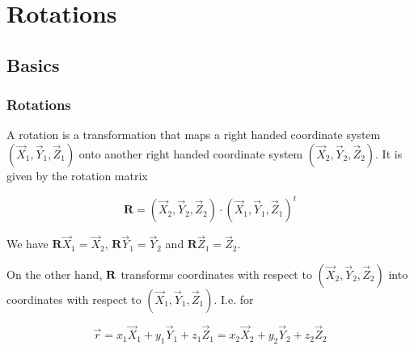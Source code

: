 \documentclass[compress]{beamer}
\begin{document}
\begin{frame}[fragile]
\begin{columns}
\begin{column}{3.5cm}
  \end{column}
\end{columns}


\end{frame}

\section{Rotations}

\subsection*{Basics}

\begin{frame}[fragile]
  \frametitle{Rotations}

  A rotation is a transformation that maps a right handed coordinate system
  $(\vec X_{1}, \vec Y_{1}, \vec Z_{1})$ onto another right handed coordinate
  system $(\vec X_{2}, \vec Y_{2}, \vec Z_{2})$. It is given by the rotation
  matrix

  \begin{equation*}
    \mathbf R = (\vec X_{2}, \vec Y_{2}, \vec Z_{2}) \cdot (\vec X_{1}, \vec Y_{1}, \vec Z_{1})^{t}
  \end{equation*}

  \medskip

  We have $\mathbf R \vec X_{1} = \vec X_{2}$, $\mathbf R \vec Y_{1} = \vec
  Y_{2}$ and $\mathbf R \vec Z_{1} = \vec Z_{2}$.

  \medskip
  \pause

  On the other hand, $\bf R$ transforms coordinates with respect to $(\vec
  X_{2}, \vec Y_{2}, \vec Z_{2})$ into coordinates with respect to $(\vec
  X_{1}, \vec Y_{1}, \vec Z_{1})$. I.e. for

  \begin{equation*}
    \vec r
    = x_{1} \vec X_{1} + y_{1} \vec Y_{1} + z_{1} \vec Z_{1}
    = x_{2} \vec X_{2} + y_{2} \vec Y_{2} + z_{2} \vec Z_{2}
  \end{equation*}


\end{frame}
\end{document}
